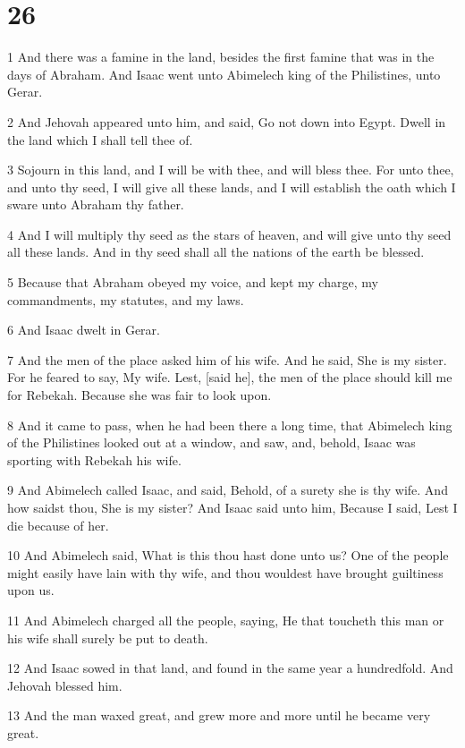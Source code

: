 \chapter{26}

\par 1 And there was a famine in the land, besides the first famine that was in the days of Abraham. And Isaac went unto Abimelech king of the Philistines, unto Gerar.
\par 2 And Jehovah appeared unto him, and said, Go not down into Egypt. Dwell in the land which I shall tell thee of.
\par 3 Sojourn in this land, and I will be with thee, and will bless thee. For unto thee, and unto thy seed, I will give all these lands, and I will establish the oath which I sware unto Abraham thy father.
\par 4 And I will multiply thy seed as the stars of heaven, and will give unto thy seed all these lands. And in thy seed shall all the nations of the earth be blessed.
\par 5 Because that Abraham obeyed my voice, and kept my charge, my commandments, my statutes, and my laws.
\par 6 And Isaac dwelt in Gerar.
\par 7 And the men of the place asked him of his wife. And he said, She is my sister. For he feared to say, My wife. Lest, [said he], the men of the place should kill me for Rebekah. Because she was fair to look upon.
\par 8 And it came to pass, when he had been there a long time, that Abimelech king of the Philistines looked out at a window, and saw, and, behold, Isaac was sporting with Rebekah his wife.
\par 9 And Abimelech called Isaac, and said, Behold, of a surety she is thy wife. And how saidst thou, She is my sister? And Isaac said unto him, Because I said, Lest I die because of her.
\par 10 And Abimelech said, What is this thou hast done unto us? One of the people might easily have lain with thy wife, and thou wouldest have brought guiltiness upon us.
\par 11 And Abimelech charged all the people, saying, He that toucheth this man or his wife shall surely be put to death.
\par 12 And Isaac sowed in that land, and found in the same year a hundredfold. And Jehovah blessed him.
\par 13 And the man waxed great, and grew more and more until he became very great.
